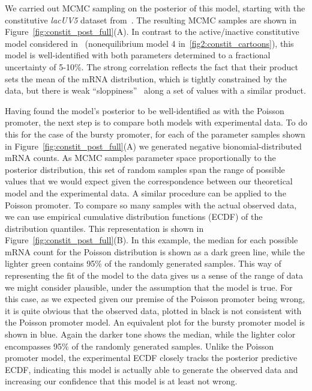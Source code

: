 We carried out MCMC sampling on the posterior of this model, starting with the
constitutive \textit{lacUV5} dataset from~\cite{Jones2014}. The resulting MCMC
samples are shown in Figure~\ref{fig:constit_post_full}(A). In contrast to the
active/inactive constitutive model considered in~\cite{Razo-Mejia2020}
(nonequilibrium model 4 in~\ref{fig2:constit_cartoons}), this model is
well-identified with both parameters determined to a fractional uncertainty of
5-10\%. The strong correlation reflects the fact that their product sets the
mean of the mRNA distribution, which is tightly constrained by the data, but
there is weak ``sloppiness''~\cite{Transtrum2015} along a set of values with a
similar product.

Having found the model's posterior to be well-identified as with the Poisson
promoter, the next step is to compare both models with experimental data. To do
this for the case of the bursty promoter, for each of the parameter samples
shown in Figure~\ref{fig:constit_post_full}(A) we generated negative
bionomial-distributed mRNA counts. As MCMC samples parameter space
proportionally to the posterior distribution, this set of random samples span
the range of possible values that we would expect given the correspondence
between our theoretical model and the experimental data. A similar procedure can
be applied to the Poisson promoter. To compare so many samples with the actual
observed data, we can use empirical cumulative distribution functions (ECDF) of
the distribution quantiles. This representation is shown in
Figure~\ref{fig:constit_post_full}(B). In this example, the median for each
possible mRNA count for the Poisson distribution is shown as a dark green line,
while the lighter green contains 95\% of the randomly generated samples. This
way of representing the fit of the model to the data gives us a sense of the
range of data we might consider plausible, under the assumption that the model
is true. For this case, as we expected given our premise of the Poisson promoter
being wrong, it is quite obvious that the observed data, plotted in black is not consistent with
the Poisson promoter model. An 
equivalent plot for the bursty promoter model is shown in blue. Again the darker
tone shows the median, while the lighter color encompasses 95\% of the randomly
generated samples. Unlike the Poisson promoter model, the experimental ECDF
closely tracks the posterior predictive ECDF, indicating this model is actually
able to generate the observed data and increasing our confidence that this model
is at least not wrong.

